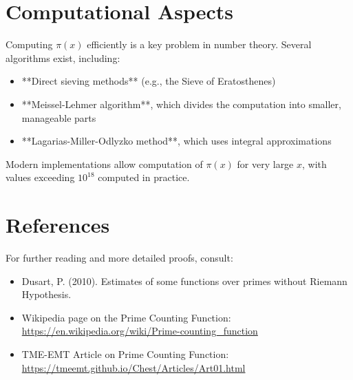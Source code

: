 \section{Computational Aspects}
Computing $\pi(x)$ efficiently is a key problem in number theory. Several algorithms exist, including:
\begin{itemize}
    \item **Direct sieving methods** (e.g., the Sieve of Eratosthenes)
    \item **Meissel-Lehmer algorithm**, which divides the computation into smaller, manageable parts
    \item **Lagarias-Miller-Odlyzko method**, which uses integral approximations
\end{itemize}
Modern implementations allow computation of $\pi(x)$ for very large $x$, with values exceeding $10^{18}$ computed in practice.

\section{References}
For further reading and more detailed proofs, consult:
\begin{itemize}
    \item Dusart, P. (2010). Estimates of some functions over primes without Riemann Hypothesis.
    \item Wikipedia page on the Prime Counting Function: \url{https://en.wikipedia.org/wiki/Prime-counting_function}
    \item TME-EMT Article on Prime Counting Function: \url{https://tmeemt.github.io/Chest/Articles/Art01.html}
\end{itemize}
